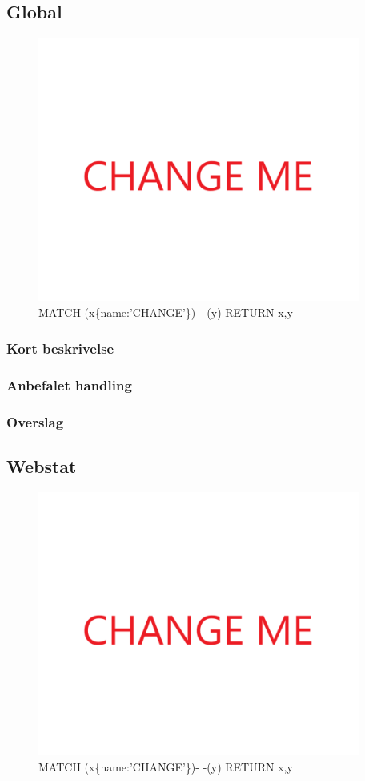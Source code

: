 \documentclass{article}
\begin{document}
\subsection{Global}
\begin{figure}[h]
\includegraphics[width=300pt]{CHANGE.PNG}
\caption{MATCH (x\{name:'CHANGE'\})- -(y) RETURN x,y}
\end{figure}
\subsubsection{Kort beskrivelse}
\subsubsection{Anbefalet handling}
\subsubsection{Overslag}
\subsection{Webstat}
\begin{figure}[h]
\includegraphics[width=300pt]{CHANGE.PNG}
\caption{MATCH (x\{name:'CHANGE'\})- -(y) RETURN x,y}
\end{figure}
\end{document}
